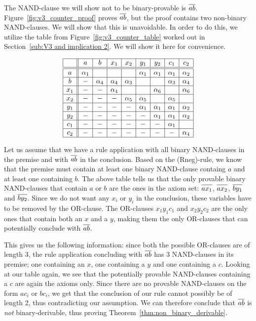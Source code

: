 The NAND-clause we will show not to be binary-provable is $\ol{ab}$.
Figure~\ref{fig:v3_counter_proof} proves $\ol{ab}$, but the proof contains two non-binary NAND-clauses.
We will show that this is unavoidable.
In order to do this, we utilize the table from Figure~\ref{fig:v3_counter_table} worked out in Section~\ref{sub:V3 and implication 2}.
We will show it here for convenience.\par
\begin{figure}[!h]
  \centering
  \[\begin{array}{|c||c|c|c|c|c|c|c|c|}
    \hline
    & a & b & x_1 & x_2 & y_1 & y_2 & c_1 & c_2 \\ \hline\hline
    a & \alpha_1 & & & & \alpha_1 & \alpha_1 & \alpha_1 & \alpha_2 \\ \hline
    b &-& \alpha_4 & \alpha_4 & \alpha_3 & & & \alpha_3 & \alpha_4 \\ \hline
    x_1 &-&-& \alpha_4 & & & \alpha_6 & & \alpha_6 \\ \hline
    x_2 &-&-&-& \alpha_5 & \alpha_5 & & \alpha_5 & \\ \hline
    y_1 &-&-&-&-& \alpha_1 & \alpha_1 & \alpha_1 & \alpha_2 \\ \hline
    y_2 &-&-&-&-&-& \alpha_1 & \alpha_1 & \alpha_2 \\ \hline
    c_1 &-&-&-&-&-&-& \alpha_1 & \\ \hline
    c_2 &-&-&-&-&-&-&-& \alpha_4 \\ \hline
  \end{array}\]
  \caption{}
  \label{fig:open_door_table}
\end{figure}

Let us assume that we have a rule application with all binary NAND-clauses in the premise and with $\ol{ab}$ in the conclusion.
Based on the (Rneg)-rule, we know that the premise must contain at least one binary NAND-clause containg $a$ and at least one containing $b$.
The above table tells us that the only provable binary NAND-clauses that contain $a$ or $b$ are the ones in the axiom set:
$\ol{ax_1}$, $\ol{ax_2}$, $\ol{by_1}$ and $\ol{by_2}$.
Since we do not want any $x_i$ or $y_i$ in the conclusion, these variables have to be removed by the OR-clause.
The OR-clauses $x_1y_1c_1$ and $x_2y_2c_2$ are the only ones that contain both an $x$ and a $y$, making them the only OR-clauses that can potentially conclude with $\ol{ab}$.

This gives us the following information: since both the possible OR-clauses are of length 3, the rule application concluding with $\ol{ab}$ has 3 NAND-clauses in its premise; one containing an $x$, one containing a $y$ and one containing a $c$.
Looking at our table again, we see that the potentially provable NAND-clauses containing a $c$ are again the axioms only.
Since there are no provable NAND-clauses on the form $ac_i$ or $bc_i$, we get that the conclusion of our rule cannot possibly be of length 2, thus contradicting our assumption.
We can therefore conclude that $\ol{ab}$ is \textit{not} binary-derivable, thus proving Theorem~\ref{thm:non_binary_derivable}.
